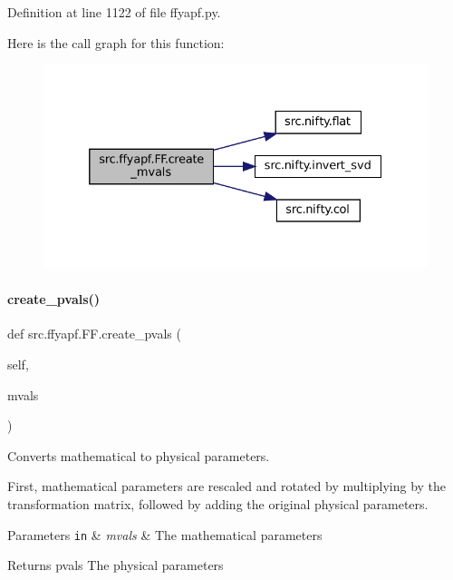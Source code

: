 Definition at line 1122 of file ffyapf.\+py.

Here is the call graph for this function\+:
\nopagebreak
\begin{figure}[H]
\begin{center}
\leavevmode
\includegraphics[width=332pt]{classsrc_1_1ffyapf_1_1FF_aa4b5af969fa68f6836150b934cb34a3a_cgraph}
\end{center}
\end{figure}
\mbox{\label{classsrc_1_1ffyapf_1_1FF_a349f2f0f401834f86f9361d8ec32ad0a}} 
\paragraph{\texorpdfstring{create\+\_\+pvals()}{create\_pvals()}}
{\footnotesize\ttfamily def src.\+ffyapf.\+F\+F.\+create\+\_\+pvals (\begin{DoxyParamCaption}\item[{}]{self,  }\item[{}]{mvals }\end{DoxyParamCaption})}



Converts mathematical to physical parameters. 

First, mathematical parameters are rescaled and rotated by multiplying by the transformation matrix, followed by adding the original physical parameters.


\begin{DoxyParams}[1]{Parameters}
\mbox{\tt in}  & {\em mvals} & The mathematical parameters \\
\hline
\end{DoxyParams}
\begin{DoxyReturn}{Returns}
pvals The physical parameters 
\end{DoxyReturn}


